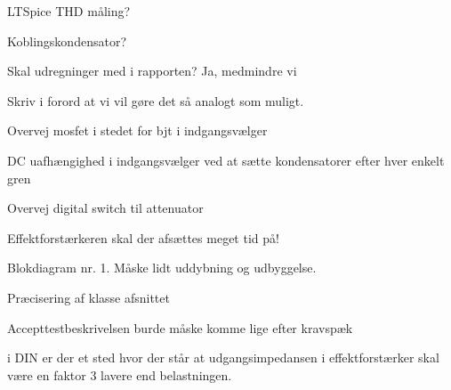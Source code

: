 LTSpice THD måling?

Koblingskondensator?

Skal udregninger med i rapporten?
Ja, medmindre vi 




Skriv i forord at vi vil gøre det så analogt som muligt.

Overvej mosfet i stedet for bjt i indgangsvælger

DC uafhængighed i indgangsvælger ved at sætte kondensatorer efter hver enkelt gren

Overvej digital switch til attenuator

Effektforstærkeren skal der afsættes meget tid på!

Blokdiagram nr. 1. Måske lidt uddybning og udbyggelse. 

Præcisering af klasse afsnittet

Accepttestbeskrivelsen burde måske komme lige efter kravspæk

i DIN er der et sted hvor der står at udgangsimpedansen i effektforstærker skal være en faktor 3 lavere end belastningen.

